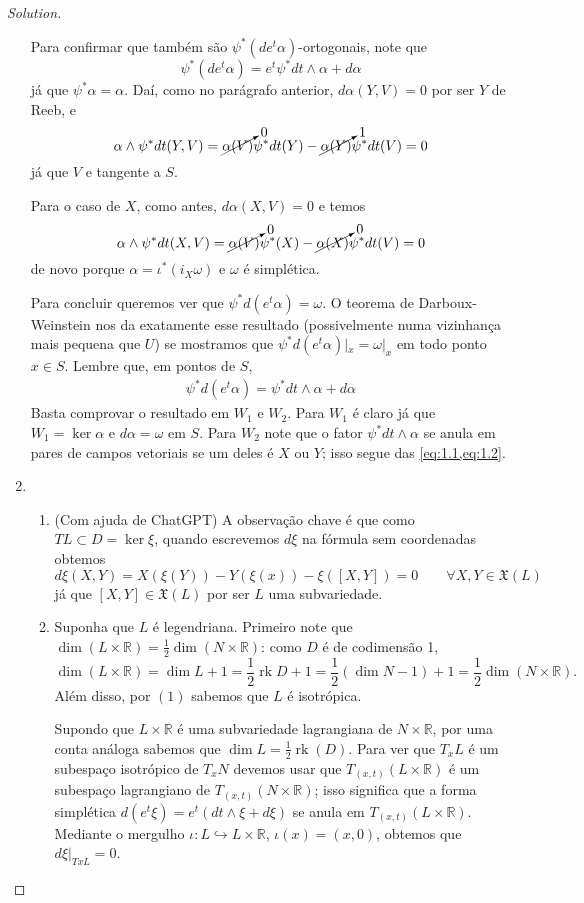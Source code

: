 \begin{proof}[Solution]
\begin{enumerate}[label=(\alph*)]
Para confirmar que também são $\psi^*(de^t\alpha)$-ortogonais, note que
\[\psi^*(de^t\alpha)=e^t \psi^*dt \wedge \alpha+d\alpha\]
já que $\psi^*\alpha=\alpha$. Daí, como no parágrafo anterior, $d\alpha(Y,V)=0$ por ser $Y$ de Reeb, e
\begin{equation}\label{eq:1.1}\alpha \wedge \psi^* dt(Y,V)=\cancelto{0}{\alpha(V)}\psi^*dt (Y)-\cancelto{1}{\alpha(Y)}\psi^*dt(V)=0\end{equation}
já que $V$ e tangente a $S$.

Para o caso de $X$, como antes, $d\alpha(X,V)=0$  e temos
\begin{equation}\label{eq:1.2}\alpha \wedge \psi^* dt(X,V)=\cancelto{0}{\alpha(V)}\psi^* (X)-\cancelto{0}{\alpha(X)}\psi^*dt(V)=0\end{equation}
de novo porque $\alpha=\iota^*(i_X\omega)$ e $\omega$ é simplética.

Para concluir queremos ver que $\psi^*d(e^t \alpha)=\omega$. O teorema de Darboux-Weinstein nos da exatamente esse resultado (possivelmente numa vizinhança mais pequena que $U$) se mostramos que $\psi^* d(e^t \alpha)|_{x}=\omega|_{x}$ em todo ponto $x \in S$. Lembre que, em pontos de $S$,
\begin{align*}\psi^*d(e^t \alpha)=\psi^*dt\wedge\alpha+d\alpha
	\end{align*}
Basta comprovar o resultado em $W_1$ e $W_2$. Para $W_1$ é claro já que $W_1=\ker \alpha$ e $d\alpha=\omega$ em $S$. Para $W_2$ note que o fator $\psi^*dt \wedge \alpha$ se anula em pares de campos vetoriais se um deles é $X$ ou $Y$; isso segue das \cref{eq:1.1,eq:1.2}.
\item 
	\begin{enumerate}[label=(\arabic*)]
	\item (Com ajuda de ChatGPT) A observação chave é que como $TL \subset D=\ker \xi$, quando escrevemos $d\xi$ na fórmula sem coordenadas obtemos
		\[d\xi(X,Y)=X(\xi(Y))-Y(\xi(x))-\xi([X,Y])=0\qquad  \forall X,Y \in \mathfrak{X}(L)\]
		já que $[X,Y] \in \mathfrak{X}(L)$ por ser $L$ uma subvariedade.

	\item Suponha que $L$ é legendriana. Primeiro note que $\dim (L\times \mathbb{R})=\frac{1}{2}\dim (N \times \mathbb{R})$: como $D$  é de codimensão 1, \[\dim (L \times \mathbb{R})=\dim L +1 =\frac{1}{2}\operatorname{rk}D +1=\frac{1}{2}(\dim N -1)+1=\frac{1}{2}\dim (N\times \mathbb{R}).\]
	Além disso, por $(1)$ sabemos que  $L$ é isotrópica.

	Supondo que $L\times \mathbb{R}$ é uma subvariedade lagrangiana de $N \times \mathbb{R}$, por uma conta análoga sabemos que $\dim L= \frac{ 1 }{2 } \operatorname{rk}( D)$. Para ver que $T_xL$ é um subespaço isotrópico de $T_x N$ devemos usar que $T_{(x,t)}(L \times \mathbb{R})$ é um subespaço lagrangiano de $T_{(x,t)}(N \times \mathbb{R})$; isso significa que a forma simplética $d(e^t \xi)=e^t(dt \wedge \xi+d\xi)$ se anula em $T_{(x,t)}(L \times \mathbb{R})$.  Mediante o mergulho $\iota:L \hookrightarrow  L\times \mathbb{R}$, $\iota(x)=(x,0)$, obtemos que $d\xi|_{TxL}=0$.


\end{enumerate}
\end{enumerate}
\end{proof}

